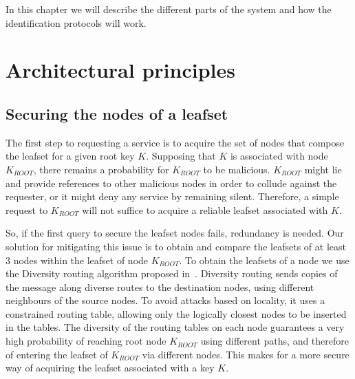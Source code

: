 
In this chapter we will describe the different parts of the system and how the
identification protocols will work.

\section{Architectural principles}

\subsection{Securing the nodes of a leafset}

The first step to requesting a service is to acquire the set of nodes that
compose the leafset for a given root key $K$. Supposing that $K$ is associated
with node $K_{ROOT}$, there remains a probability for $K_{ROOT}$ to be
malicious. $K_{ROOT}$ might lie and provide references to other malicious nodes
in order to collude against the requester, or it might deny any service by
remaining silent. Therefore, a simple request to $K_{ROOT}$ will not suffice to
acquire a reliable leafset associated with $K$.

So, if the first query to secure the leafset nodes fails, redundancy is needed.
Our solution  for mitigating this issue is to obtain and compare the leafsets
of at least 3 nodes within the leafset of node $K_{ROOT}$.
To obtain the leafsets of a node we use the Diversity routing algorithm
proposed in~\cite{castro2002secure}. Diversity routing sends copies of the message
along diverse routes to the destination nodes, using different
neighbours of the source nodes. To avoid attacks based on locality, it uses a
constrained routing table, allowing only the logically closest nodes to be inserted
in the tables. 
The diversity of the routing tables on each node guarantees a very high probability
of reaching root node $K_{ROOT}$ using different paths, and therefore of
entering the leafset of $K_{ROOT}$ via different nodes. This makes for a more
secure way of acquiring the leafset associated with a key $K$.



